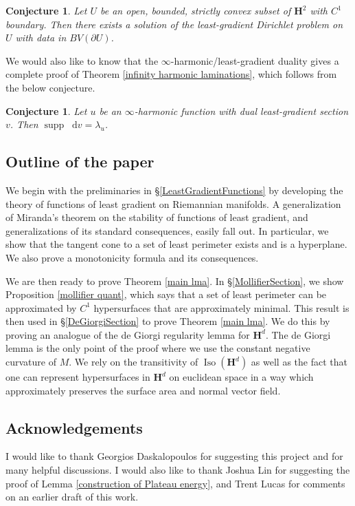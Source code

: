 \documentclass[reqno,12pt,letterpaper]{amsart}
\newcommand{\Hyp}{\mathbf H}
\DeclareMathOperator{\Iso}{Iso}
\DeclareMathOperator{\supp}{supp}
\newcommand*\dif{\mathop{}\!\mathrm{d}}
\newtheorem{conjecture}[theorem]{Conjecture}
\theoremstyle{definition}
\numberwithin{equation}{section}
\begin{document}
\begin{conjecture}
Let $U$ be an open, bounded, strictly convex subset of $\Hyp^2$ with $C^1$ boundary.
Then there exists a solution of the least-gradient Dirichlet problem on $U$ with data in $BV(\partial U)$.
\end{conjecture}

We would also like to know that the $\infty$-harmonic/least-gradient duality gives a complete proof of Theorem \ref{infinity harmonic laminations}, which follows from the below conjecture.

\begin{conjecture}\label{two laminations agree}
Let $u$ be an $\infty$-harmonic function with dual least-gradient section $v$.
Then $\supp \dif v = \lambda_u$.
\end{conjecture}


\subsection{Outline of the paper}
We begin with the preliminaries in \S\ref{LeastGradientFunctions} by developing the theory of functions of least gradient on Riemannian manifolds. A generalization of Miranda's theorem \cite[Teorema 3]{Miranda67} on the stability of functions of least gradient, and generalizations of its standard consequences, easily fall out.
In particular, we show that the tangent cone to a set of least perimeter exists and is a hyperplane.
We also prove a monotonicity formula and its consequences.

We are then ready to prove Theorem \ref{main lma}.
In \S\ref{MollifierSection}, we show Proposition \ref{mollifier quant}, which says that a set of least perimeter can be approximated by $C^1$ hypersurfaces that are approximately minimal.
This result is then used in \S\ref{DeGiorgiSection} to prove Theorem \ref{main lma}. We do this by proving an analogue of the de Giorgi regularity lemma \cite[Teorema 5.7]{Miranda66} for $\Hyp^d$. The de Giorgi lemma is the only point of the proof where we use the constant negative curvature of $M$.
We rely on the transitivity of $\Iso(\Hyp^d)$ as well as the fact that one can represent hypersurfaces in $\Hyp^d$ on euclidean space in a way which approximately preserves the surface area and normal vector field.


\subsection{Acknowledgements}
I would like to thank Georgios Daskalopoulos for suggesting this project and for many helpful discussions.
I would also like to thank Joshua Lin for suggesting the proof of Lemma \ref{construction of Plateau energy}, and Trent Lucas for comments on an earlier draft of this work.
\end{document}
